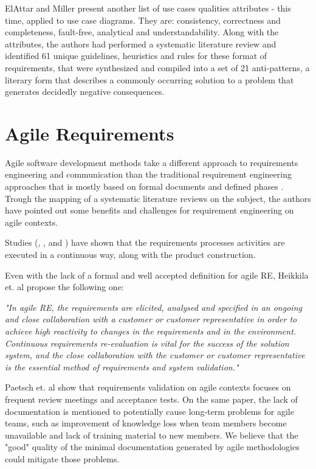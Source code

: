 ElAttar and Miller \cite{Attar_2012} present another list of use cases qualities attributes - this time, applied to use case diagrams. They are: consistency, correctness and completeness, fault-free, analytical and understandability. Along with the attributes, the authors had performed a systematic literature review and identified 61 unique guidelines, heuristics and rules for these format of requirements, that were synthesized and compiled into a set of 21 anti-patterns, a literary form that describes a commonly occurring solution to a problem that generates decidedly negative consequences.

\section{Agile Requirements}

Agile software development methods take a different approach to requirements engineering and communication than the traditional requirement engineering approaches that is mostly based on formal documents and defined phases \cite{Heikkila_et_dot_al_2015}. Trough the mapping of a systematic literature reviews on the subject, the authors have pointed out some benefits and challenges for requirement engineering on agile contexts. 

Studies (\cite{Medeiros_2015}, \cite{Paetsch_et_dot_al_2003}, \cite{Heikkila_et_dot_al_2015} and \cite{Inayat_2015}) have shown that the requirements processes activities are executed in a continuous way, along with the product construction. 

Even with the lack of a formal and well accepted definition for agile RE, Heikkila et. al \cite{Heikkila_et_dot_al_2015} propose the following one:

\begin{framed}
\textit{"In agile RE, the requirements are elicited, analysed and specified in an ongoing and close collaboration with a customer or customer representative in order to achieve high reactivity to changes in the requirements and in the environment. Continuous requirements re-evaluation is vital for the success of the solution system, and the close collaboration with the customer or customer representative is the essential method of requirements and system validation."}
\end{framed}

Paetsch et. al \cite{Paetsch_et_dot_al_2003} show that requirements validation on agile contexts focuses on frequent review meetings and acceptance tests. On the same paper, the lack of documentation is mentioned to potentially cause long-term problems for agile teams, such as improvement of knowledge loss when team members become unavailable and lack of training material to new members. We believe that the "good" quality of the minimal documentation generated by agile methodologies could mitigate those problems. 

